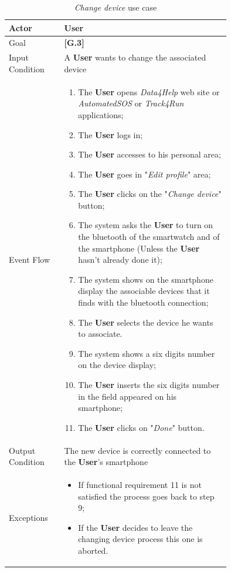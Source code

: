 \begin{center}
\begin{table}[H]
\begin{tabular}{ | l | p{0.75\linewidth} | }
  \hline
    Actor & \textbf{User} \\ \hline
    Goal & \textbf{[G.3]} \\ \hline
    Input Condition & A \textbf{User} wants to change the associated device\\ \hline
    Event Flow & \begin{minipage}[t]{0.7\textwidth}
      \begin{enumerate}
        \item The \textbf{User} opens \textit{Data4Help} web site or \textit{AutomatedSOS} or \textit{Track4Run} applications;
        \item The \textbf{User} logs in;
        \item The \textbf{User} accesses to his personal area;
        \item The \textbf{User} goes in "\textit{Edit profile}" area;
        \item The \textbf{User} clicks on the "\textit{Change device}" button;
        \item The system asks the \textbf{User} to turn on the bluetooth of the smartwatch and of the smartphone (Unless the \textbf{User} hasn't already done it);
        \item The system shows on the smartphone display the associable devices that it finds with the bluetooth connection;
        \item The \textbf{User} selects the device he wants to associate.
        \item The system shows a six digits number on the device display;
        \item The \textbf{User} inserts the six digits number in the field appeared on his smartphone;
        \item The \textbf{User} clicks on "\textit{Done}" button.
      \end{enumerate}
    \smallskip
  \end{minipage} \\ \hline
  Output Condition & The new device is correctly connected to the \textbf{User}'s smartphone \\ \hline
  Exceptions & \begin{minipage}[t]{0.7\textwidth}
    \begin{itemize}
      \smallskip
      \item If functional requirement 11 is not satisfied the process goes back to step 9;
      \item If the \textbf{User} decides to leave the changing device process this one is aborted.
    \end{itemize}
    \smallskip
  \end{minipage}  \\ \hline
\end{tabular}
\caption{\textit{Change device} use case}
\label{table:changeDeviceTable}
\end{table}
\end{center}

